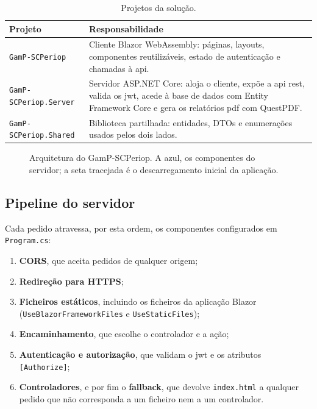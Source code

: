 \begin{table}[H]
    \centering
    \small
    \begin{tabularx}{\linewidth}{lX}
        \toprule
        \textbf{Projeto} & \textbf{Responsabilidade} \\
        \midrule
        \texttt{GamP-SCPeriop} & Cliente Blazor WebAssembly: páginas, layouts, componentes reutilizáveis, estado de autenticação e chamadas à \gls{api}. \\
        \midrule
        \texttt{GamP-SCPeriop.Server} & Servidor ASP.NET Core: aloja o cliente, expõe a \gls{api} \gls{rest}, valida os \gls{jwt}, acede à base de dados com Entity Framework Core e gera os relatórios \gls{pdf} com QuestPDF. \\
        \midrule
        \texttt{GamP-SCPeriop.Shared} & Biblioteca partilhada: entidades, DTOs e enumerações usados pelos dois lados. \\
        \bottomrule
    \end{tabularx}
    \caption{Projetos da solução.}
    \label{tab:projetos}
\end{table}

\begin{figure}[H]
    \centering
    \resizebox{\linewidth}{!}{}
    \caption{Arquitetura do GamP-SCPeriop. A azul, os componentes do servidor; a seta tracejada é o descarregamento inicial da aplicação.}
    \label{fig:arquitetura}
\end{figure}

\subsection{Pipeline do servidor}

Cada pedido atravessa, por esta ordem, os componentes configurados em \texttt{Program.cs}:

\begin{enumerate}
    \item \textbf{CORS}, que aceita pedidos de qualquer origem;
    \item \textbf{Redireção para HTTPS};
    \item \textbf{Ficheiros estáticos}, incluindo os ficheiros da aplicação Blazor (\texttt{UseBlazor\-Framework\-Files} e \texttt{Use\-Static\-Files});
    \item \textbf{Encaminhamento}, que escolhe o controlador e a ação;
    \item \textbf{Autenticação e autorização}, que validam o \gls{jwt} e os atributos \texttt{[Authorize]};
    \item \textbf{Controladores}, e por fim o \textbf{fallback}, que devolve \texttt{index.html} a qualquer pedido que não corresponda a um ficheiro nem a um controlador.
\end{enumerate}

